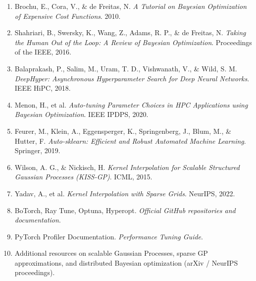 \documentclass[11pt]{article}
\begin{document}
\begin{enumerate}

\item Brochu, E., Cora, V., \& de Freitas, N.  
\textit{A Tutorial on Bayesian Optimization of Expensive Cost Functions}.  
2010.

\item Shahriari, B., Swersky, K., Wang, Z., Adams, R. P., \& de Freitas, N.  
\textit{Taking the Human Out of the Loop: A Review of Bayesian Optimization}.  
Proceedings of the IEEE, 2016.

\item Balaprakash, P., Salim, M., Uram, T. D., Vishwanath, V., \& Wild, S. M.  
\textit{DeepHyper: Asynchronous Hyperparameter Search for Deep Neural Networks}.  
IEEE HiPC, 2018.

\item Menon, H., et al.  
\textit{Auto-tuning Parameter Choices in HPC Applications using Bayesian Optimization}.  
IEEE IPDPS, 2020.

\item Feurer, M., Klein, A., Eggensperger, K., Springenberg, J., Blum, M., \& Hutter, F.  
\textit{Auto-sklearn: Efficient and Robust Automated Machine Learning}.  
Springer, 2019.

\item Wilson, A. G., \& Nickisch, H.  
\textit{Kernel Interpolation for Scalable Structured Gaussian Processes (KISS-GP)}.  
ICML, 2015.

\item Yadav, A., et al.  
\textit{Kernel Interpolation with Sparse Grids}.  
NeurIPS, 2022.

\item BoTorch, Ray Tune, Optuna, Hyperopt.  
\textit{Official GitHub repositories and documentation}.

\item PyTorch Profiler Documentation.  
\textit{Performance Tuning Guide}.

\item Additional resources on scalable Gaussian Processes, sparse GP approximations, and distributed Bayesian optimization (arXiv / NeurIPS proceedings).

\end{enumerate}
\end{document}
